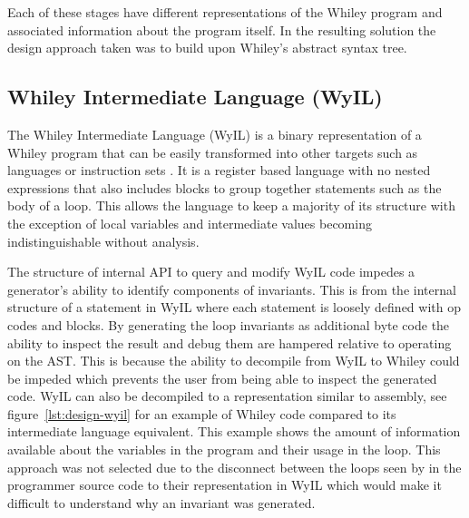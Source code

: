Each of these stages have different representations of the Whiley program and
associated information about the program itself.
In the resulting solution the design approach taken was to build upon
Whiley's abstract syntax tree.

\subsection{Whiley Intermediate Language (WyIL)}

The Whiley Intermediate Language (WyIL) is a binary representation of a Whiley program
that can be easily transformed into other targets such as languages or
instruction sets \cite{wyil}.
It is a register based language with no nested expressions
that also includes blocks to group together statements such as the body of a loop.
This allows the language to keep a majority of its structure with the
exception of local variables and intermediate values becoming indistinguishable
without analysis.

The structure of internal API to query and modify WyIL code impedes a
generator's ability to identify components of invariants.
This is from the internal structure of a statement in WyIL where each
statement is loosely defined with op codes and blocks.
By generating the loop invariants as additional byte code the ability to
inspect the result and debug them are hampered relative to operating on the
AST.  This is because the ability to decompile from WyIL to Whiley could
be impeded which prevents the user from being able to inspect the generated
code.
WyIL can also be decompiled to a representation similar to assembly, see
figure~\ref{lst:design-wyil} for an example of Whiley code compared to its
intermediate language equivalent.
This example shows the amount of information available about the variables
in the program and their usage in the loop.
This approach was not selected due to the disconnect between the loops
seen by in the programmer source code to their representation in WyIL which
would make it difficult to understand why an invariant was generated.


